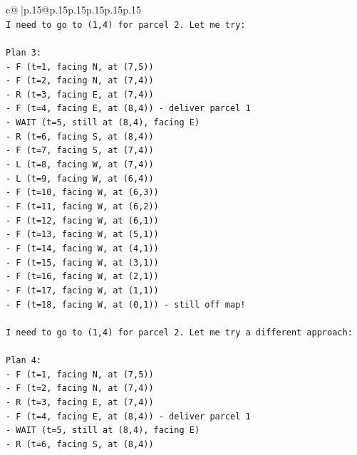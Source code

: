 \documentclass{article}
\begin{document}
{\begin{supertabular}{c@{$\;$}|p{.15\linewidth}@{}p{.15\linewidth}p{.15\linewidth}p{.15\linewidth}p{.15\linewidth}p{.15\linewidth}}
{{{\\ 
\texttt{I need to go to (1,4) for parcel 2. Let me try:} \\
\\ 
\texttt{Plan 3:} \\
\texttt{{-} F (t=1, facing N, at (7,5))} \\
\texttt{{-} F (t=2, facing N, at (7,4))} \\
\texttt{{-} R (t=3, facing E, at (7,4))} \\
\texttt{{-} F (t=4, facing E, at (8,4)) {-} deliver parcel 1} \\
\texttt{{-} WAIT (t=5, still at (8,4), facing E)} \\
\texttt{{-} R (t=6, facing S, at (8,4))} \\
\texttt{{-} F (t=7, facing S, at (7,4))} \\
\texttt{{-} L (t=8, facing W, at (7,4))} \\
\texttt{{-} L (t=9, facing W, at (6,4))} \\
\texttt{{-} F (t=10, facing W, at (6,3))} \\
\texttt{{-} F (t=11, facing W, at (6,2))} \\
\texttt{{-} F (t=12, facing W, at (6,1))} \\
\texttt{{-} F (t=13, facing W, at (5,1))} \\
\texttt{{-} F (t=14, facing W, at (4,1))} \\
\texttt{{-} F (t=15, facing W, at (3,1))} \\
\texttt{{-} F (t=16, facing W, at (2,1))} \\
\texttt{{-} F (t=17, facing W, at (1,1))} \\
\texttt{{-} F (t=18, facing W, at (0,1)) {-} still off map!} \\
\\ 
\texttt{I need to go to (1,4) for parcel 2. Let me try a different approach:} \\
\\ 
\texttt{Plan 4:} \\
\texttt{{-} F (t=1, facing N, at (7,5))} \\
\texttt{{-} F (t=2, facing N, at (7,4))} \\
\texttt{{-} R (t=3, facing E, at (7,4))} \\
\texttt{{-} F (t=4, facing E, at (8,4)) {-} deliver parcel 1} \\
\texttt{{-} WAIT (t=5, still at (8,4), facing E)} \\
\texttt{{-} R (t=6, facing S, at (8,4))} \\
}}}
\end{supertabular}}
\end{document}
